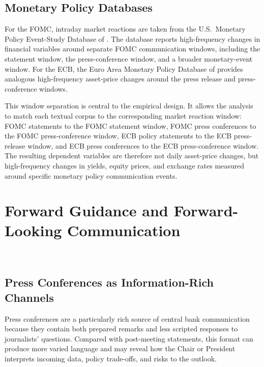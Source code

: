 \subsection{Monetary Policy Databases}

For the FOMC, intraday market reactions are taken from the U.S.\
Monetary Policy Event-Study Database of \citet{acosta2025}. The
database reports high-frequency changes in financial variables around
separate FOMC communication windows, including the statement window, the
press-conference window, and a broader monetary-event window. For the
ECB, the Euro Area Monetary Policy Database of \citet{altavilla2019}
provides analogous high-frequency asset-price changes around the press
release and press-conference windows.

This window separation is central to the empirical design. It allows the
analysis to match each textual corpus to the corresponding market
reaction window: FOMC statements to the FOMC statement window, FOMC press
conferences to the FOMC press-conference window, ECB policy statements
to the ECB press-release window, and ECB press conferences to the ECB
press-conference window. The resulting dependent variables are therefore
not daily asset-price changes, but high-frequency changes in yields,
equity prices, and exchange rates measured around specific monetary
policy communication events.



\section{Forward Guidance and Forward-Looking Communication}
\label{sec:lit_forward}

\



\subsection{Press Conferences as Information-Rich Channels}

Press conferences are a particularly rich source of central bank
communication because they contain both prepared remarks and less
scripted responses to journalists' questions. Compared with
post-meeting statements, this format can produce more varied language
and may reveal how the Chair or President interprets incoming data,
policy trade-offs, and risks to the outlook.

